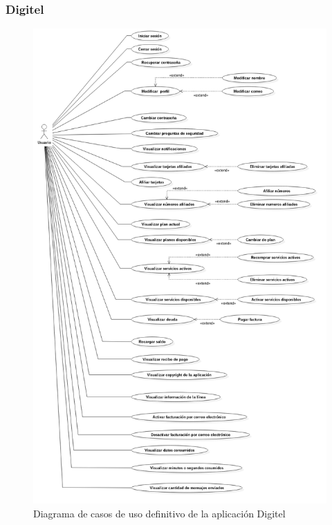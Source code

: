 \documentclass{beamer}
\begin{document}

\begin{frame}[fragile]
\frametitle{Digitel}
\begin{figure}[H]
  \includegraphics[scale=0.1,type=png,ext=.png,read=.png,angle=0,origin=c]{../diagramas/CU/digitel/digitelCU}
  \caption*{Diagrama de casos de uso definitivo de la aplicación Digitel}
\end{figure}

\end{frame}


\end{document}
